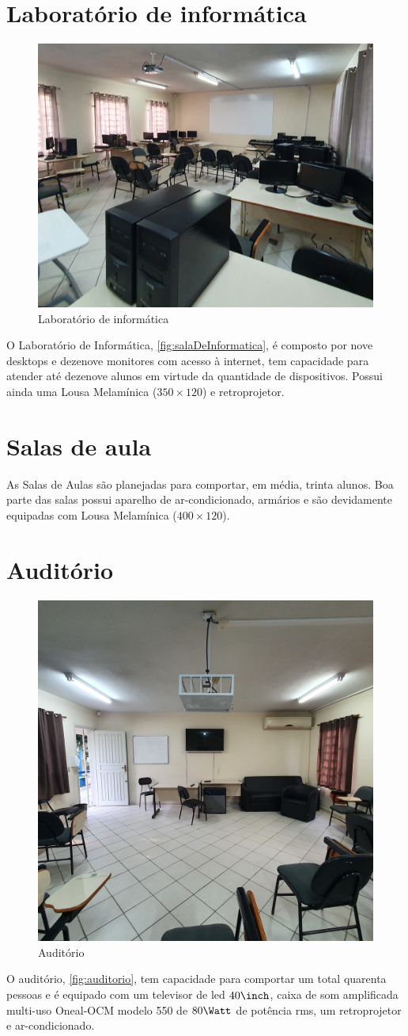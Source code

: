 \section{Laboratório de informática}
\setlength\intextsep{0pt}
\begin{figure}
    \centering
    \includegraphics[width=.4\textwidth]{03-elementos/03.2_textual/03.2.1_fig/sala-de-informatica02.jpg} 
    \caption{Laboratório de informática}
    \label{fig:salaDeInformatica}  
\end{figure}
O Laboratório de Informática, \autoref{fig:salaDeInformatica}, é composto por nove desktops e dezenove monitores com acesso à internet, tem capacidade para atender até dezenove alunos em virtude da quantidade de dispositivos. Possui ainda uma Lousa Melamínica ($350\times 120$)\cm\; e retroprojetor.

\section{Salas de aula}
As Salas de Aulas são planejadas para comportar, em média, trinta alunos. Boa parte das salas possui aparelho de ar-condicionado, armários e são devidamente equipadas com Lousa Melamínica ($400\times 120$)\cm.

\section{Auditório}
\setlength\intextsep{0pt}
\begin{figure}
    \centering
    \includegraphics[width=.35\textwidth]{03-elementos/03.2_textual/03.2.1_fig/auditorio01.jpg} 
    \caption{Auditório}
    \label{fig:auditorio}    
\end{figure}
O auditório, \autoref{fig:auditorio}, tem capacidade para comportar um total quarenta pessoas e é equipado com um televisor de led $40\inch$, caixa de som amplificada multi-uso Oneal-OCM modelo 550 de $80\Watt$ de potência rms, um retroprojetor e ar-condicionado.

